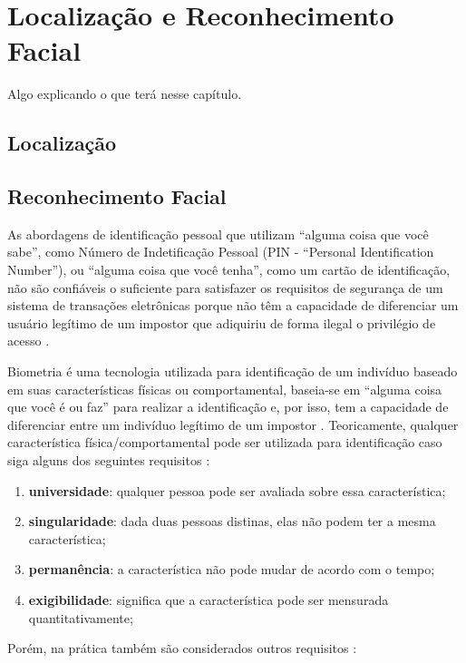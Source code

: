 
\chapter{Localização e Reconhecimento Facial}

	Algo explicando o que terá nesse capítulo.


\section{Localização}

\section{Reconhecimento Facial}

As abordagens de identificação pessoal que utilizam ``alguma coisa que você sabe'', como Número de Indetificação Pessoal (PIN - ``Personal Identification Number''), ou ``alguma coisa que você tenha'', como um cartão de identificação, não são confiáveis o suficiente para satisfazer os requisitos de segurança de um sistema de transações eletrônicas porque não têm a capacidade de diferenciar um usuário legítimo de um impostor que adiquiriu de forma ilegal o privilégio de acesso \cite{hong}.

Biometria é uma tecnologia utilizada para identificação de um indivíduo baseado em suas características físicas ou comportamental, baseia-se em ``alguma coisa que você é ou faz'' para realizar a identificação e, por isso, tem a capacidade de diferenciar entre um indivíduo legítimo de um impostor \cite{hong}. Teoricamente, qualquer característica física/comportamental pode ser utilizada para identificação caso siga alguns dos seguintes requisitos \cite{milene}: 

	\begin{enumerate}
		\item \textbf{universidade}: qualquer pessoa pode ser avaliada sobre essa característica;
		\item \textbf{singularidade}: dada duas pessoas distinas, elas não podem ter a mesma característica;
		\item \textbf{permanência}: a característica não pode mudar de acordo com o tempo;
		\item \textbf{exigibilidade}: significa que a característica pode ser mensurada quantitativamente;
	\end{enumerate}

Porém, na prática também são considerados outros requisitos \cite{milene}:

